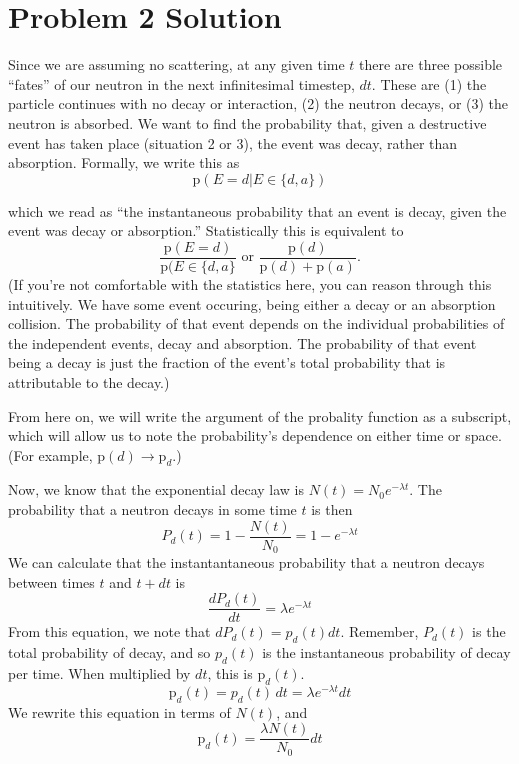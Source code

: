 \section*{Problem 2 Solution}

Since we are assuming no scattering, at any given time $t$ there are three possible ``fates'' of our neutron in the next infinitesimal timestep, $dt$. These are (1) the particle continues with no decay or interaction, (2) the neutron decays, or (3) the neutron is absorbed. We want to find the probability that, given a destructive event has taken place (situation 2 or 3), the event was decay, rather than absorption. Formally, we write this as 
$$ \text{p}(E=d | E \in \{d,a\}) $$

which we read as ``the instantaneous probability that an event is decay, given the event was decay or absorption.'' Statistically this is equivalent to
\begin{equation}
\label{prob}
\frac{\text{p}(E=d)}{\text{p}(E \in \{d,a\}} \text{ or } \frac{\text{p}(d)}{\text{p}(d) + \text{p}(a)}.
\end{equation}
(If you're not comfortable with the statistics here, you can reason through this intuitively. We have some event occuring, being either a decay or an absorption collision. The probability of that event depends on the individual probabilities of the independent events, decay and absorption. The probability of that event being a decay is just the fraction of the event's total probability that is attributable to the decay.)

From here on, we will write the argument of the probality function as a subscript, which will allow us to note the probability's dependence on either time or space. (For example, $\text{p}(d) \rightarrow \text{p}_d$.)

Now, we know that the exponential decay law is $N(t) = N_0 e^{-\lambda t}$. The probability that a neutron decays in some time $t$ is then
$$ P_d(t) = 1-\frac{N(t)}{N_0} = 1-e^{-\lambda t} $$
We can calculate that the instantantaneous probability that a neutron decays between times $t$ and $t+dt$ is 
$$ \frac{dP_d(t)}{dt} = \lambda e^{-\lambda t} $$
From this equation, we note that $dP_d(t) = p_d(t)dt$. Remember, $P_d(t)$ is the total probability of decay, and so $p_d(t)$ is the instantaneous probability of decay per time. When multiplied by $dt$, this is $\text{p}_d(t)$.
$$ \text{p}_d(t) = p_d(t) \, dt = \lambda e^{-\lambda t} dt $$
We rewrite this equation in terms of $N(t)$, and  
$$ \text{p}_d(t) = \frac{\lambda N(t)}{N_0} dt$$

